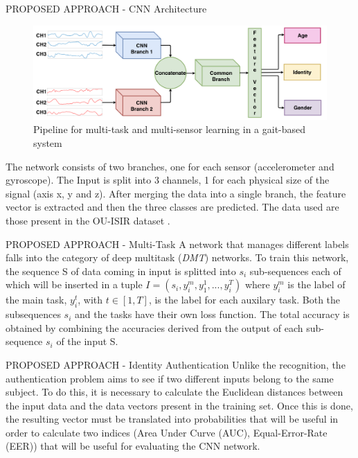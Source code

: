\begin{frame}{PROPOSED APPROACH - CNN Architecture}
    \begin{figure}[htbp]
        \centering
        \includegraphics[width = 0.8 \linewidth]{images/paper5/architecture.png}
        \centering
        \caption{Pipeline for multi-task and multi-sensor learning in a gait-based system}
        \label{fig:pipeline}
    \end{figure}
    The network consists of two branches, one for each sensor (accelerometer 
    and gyroscope). The Input is split into 3 channels, 1 for each physical 
    size of the signal (axis x, y and z). After merging the data into a single 
    branch, the feature vector is extracted and then the three classes are 
    predicted. The data used are those present in the OU-ISIR dataset \small{}.
\end{frame}

\begin{frame}{PROPOSED APPROACH - Multi-Task}
    A network that manages different labels falls into the category of deep 
    multitask (\emph{DMT}) networks. To train this network, the sequence S of data 
    coming in input is splitted into $ s_i $ sub-sequences each of which will be 
    inserted in a tuple $ I = (s_i, y_i^m, y_1^1, ..., y_i^T) $ where $ y_i^m $ is the label of the 
    main task, $ y_i^t $, with $ t \in [1,T] $, is the label for each auxilary task. Both 
    the subsequences $ s_i $ and the tasks have their own loss function. The  total  
    accuracy  is  obtained  by combining the accuracies derived from the output 
    of each sub-sequence $ s_i $  of  the  input  S.
\end{frame}

\begin{frame}{PROPOSED APPROACH - Identity Authentication}
    Unlike the recognition, the authentication problem aims to see if 
    two different inputs belong to the same subject. To do this, it is necessary 
    to calculate the Euclidean distances between the input data and the data 
    vectors present in the training set. Once this is done, the resulting vector 
    must be translated into probabilities that will be useful in order to 
    calculate two indices (Area Under Curve (AUC), Equal-Error-Rate 
    (EER)) that will be useful for evaluating the CNN network.
\end{frame}

